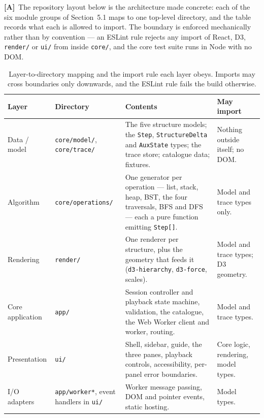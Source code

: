 \documentclass[11pt,a4paper]{article}
\newcommand{\A}{\textcolor{asmc}{\textbf{[A]}}}     %
\newcommand{\ct}[1]{\texttt{#1}}
\begin{document}
\A\ The repository layout below is the architecture made concrete: each of the six module groups of
Section~5.1 maps to one top-level directory, and the table records what each is allowed to import.
The boundary is enforced mechanically rather than by convention --- an ESLint rule rejects any
import of React, D3, \ct{render/} or \ct{ui/} from inside \ct{core/}, and the core test suite runs
in Node with no DOM.

\begin{table}[H]
\centering
\small
\setlength{\tabcolsep}{4pt}
\begin{tabular}{@{}L{2.3cm}L{3.0cm}L{6.4cm}L{3.3cm}@{}}
\toprule
\textbf{Layer} & \textbf{Directory} & \textbf{Contents} & \textbf{May import} \\
\midrule
Data / model & \ct{core/model/}, \ct{core/trace/} & The five structure models; the \ct{Step},
\ct{StructureDelta} and \ct{AuxState} types; the trace store; catalogue data; fixtures. & Nothing
outside itself; no DOM. \\
Algorithm & \ct{core/operations/} & One generator per operation --- list, stack, heap, BST, the
four traversals, BFS and DFS --- each a pure function emitting \ct{Step[]}. & Model and trace types
only. \\
Rendering & \ct{render/} & One renderer per structure, plus the geometry that feeds it
(\ct{d3-hierarchy}, \ct{d3-force}, scales). & Model and trace types; D3 geometry. \\
Core application & \ct{app/} & Session controller and playback state machine, validation, the
catalogue, the Web Worker client and worker, routing. & Model and trace types. \\
Presentation & \ct{ui/} & Shell, sidebar, guide, the three panes, playback controls,
accessibility, per-panel error boundaries. & Core logic, rendering, model types. \\
I/O adapters & \ct{app/worker*}, event handlers in \ct{ui/} & Worker message passing, DOM and
pointer events, static hosting. & Model types. \\
\bottomrule
\end{tabular}
\caption{Layer-to-directory mapping and the import rule each layer obeys. Imports may cross
boundaries only downwards, and the ESLint rule fails the build otherwise.}
\label{tab:modules}
\end{table}
\end{document}
